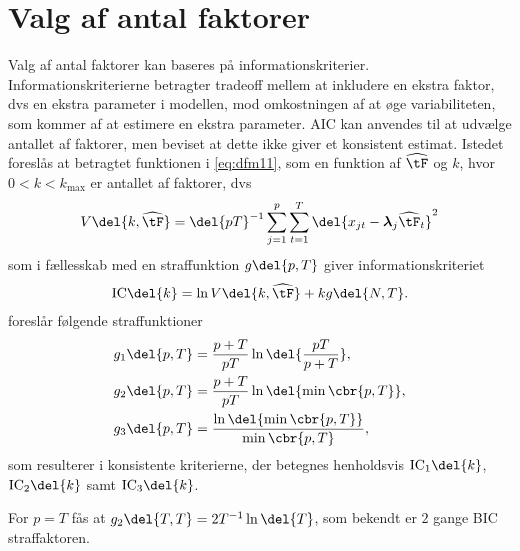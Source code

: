 \section{Valg af antal faktorer}
%
Valg af antal faktorer kan baseres på informationskriterier.
Informationskriterierne betragter tradeoff mellem at inkludere en ekstra faktor, dvs en ekstra parameter i modellen, mod omkostningen af at øge variabiliteten, som kommer af at estimere en ekstra parameter.
AIC kan anvendes til at udvælge antallet af faktorer, men \citep{Bai_Ng} beviset at dette ikke giver et konsistent estimat.
Istedet foreslås at betragtet funktionen i \eqref{eq:dfm11}, som en funktion af \(\widehat{\tF}\) og \(k\), hvor \(0<k<k_\text{max}\) er antallet af faktorer, dvs
\begin{align*}
V \del{k, \widehat{\tF}} = \del{pT}^{-1} \sum_{j=1}^p \sum_{t=1}^T \del{x_{jt} -\boldsymbol{\lambda}_j \widehat{\tF}_t}^2
\end{align*}
som i fællesskab med en straffunktion \(g \del{p,T}\) giver informationskriteriet
\begin{align*}
\text{IC} \del{k} = \ln V \del{k, \widehat{\tF}} + k g \del{N,T}.
\end{align*}
\citep{Bai_Ng} foreslår følgende straffunktioner
\begin{align*}
g_1 \del{p,T} &= \frac{p + T}{p T} \ln \del{\frac{pT}{p + T}}, \\
g_2 \del{p,T} &= \frac{p + T}{p T} \ln \del{ \min \cbr{p, T}}, \\
g_3 \del{p,T} &= \frac{\ln \del{\min \cbr{p, T}}}{\min \cbr{p, T}},
\end{align*}
som resulterer i konsistente kriterierne, der betegnes henholdsvis \(\text{IC}_1 \del{k}\), \(\text{IC}_2 \del{k}\) samt \(\text{IC}_3 \del{k}\).

For \(p = T\) fås at \(g_2 \del{T,T} = 2T^{-1} \ln \del{T}\), som bekendt er \(2\) gange BIC straffaktoren.

